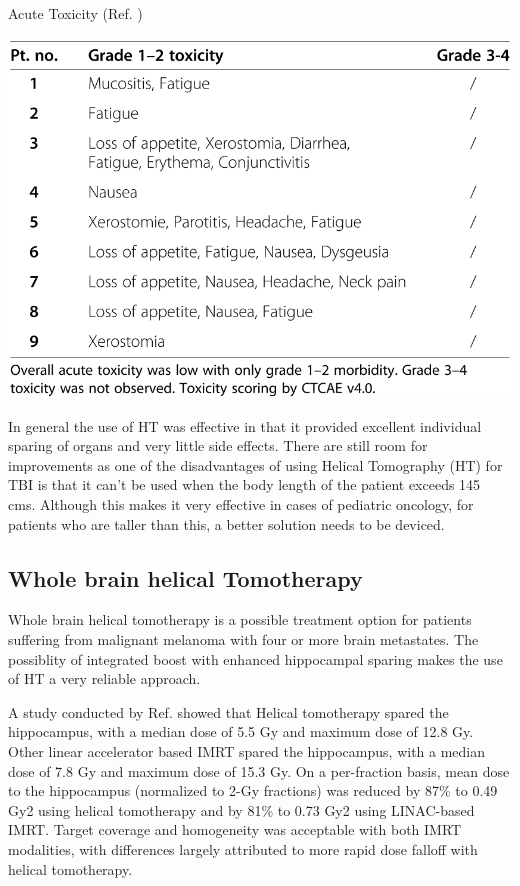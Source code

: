 \documentclass[10pt,journal,compsoc]{IEEEtran} %
\begin{document}
  \begin{table}[t]
    \caption{Acute Toxicity (Ref. \cite{Gruen2013})}
    \centering
    \includegraphics[width=\linewidth]{fig8.png}
    \label{tbi_side}
  \end{table}
  
  In general the use of HT was effective in that it provided excellent 
  individual sparing of organs and very little side effects. There are still 
  room for improvements as one of the disadvantages of using Helical Tomography 
  (HT) for TBI is that it 
  can't be used when the body length of the patient exceeds 145 cms. Although 
  this makes it very effective in cases of pediatric oncology, for 
  patients who are taller than this, a better solution needs to be deviced.
  
  \subsection{Whole brain helical Tomotherapy}
  Whole brain helical tomotherapy is a possible treatment option for patients 
  suffering from malignant melanoma with four or more brain metastates. The 
  possiblity of integrated boost with enhanced hippocampal sparing makes the 
  use of HT a very reliable approach.
  
  A study conducted by Ref. \cite{Gondi2010} showed that Helical 
  tomotherapy 
  spared the hippocampus, with a median dose of 5.5 Gy and maximum 
  dose of 12.8 
  Gy. Other linear accelerator based IMRT spared the hippocampus, 
  with a median 
  dose of 7.8 Gy and maximum dose of 15.3 Gy. On a per-fraction 
  basis, mean 
  dose to the hippocampus (normalized to 2-Gy fractions) was reduced 
  by 87\% to 
  0.49 Gy2 using helical tomotherapy and by 81\% to 0.73 Gy2 using 
  LINAC-based 
  IMRT. Target coverage and homogeneity was acceptable with both IMRT 
  modalities, with differences largely attributed to more rapid dose 
  falloff 
  with helical tomotherapy.
  
\end{document}

